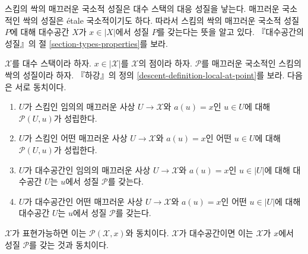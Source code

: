 \noindent
스킴의 싹의 매끄러운 국소적 성질은 대수 스택의 대응 성질을 낳는다.
매끄러운 국소적인 싹의 성질은 \'etale 국소적이기도 하다.
따라서 스킴의 싹의 매끄러운 국소적 성질 $P$에 대해 대수공간 $X$가
$x \in |X|$에서 성질 $P$를 갖는다는 뜻을 알고 있다.
『대수공간의 성질』의 절 \ref{section-types-properties}를 보라.

\begin{lemma}
\label{lemma-local-source-target-at-point}
$\mathcal{X}$를 대수 스택이라 하자.
$x \in |\mathcal{X}|$를 $\mathcal{X}$의 점이라 하자.
$\mathcal{P}$를 매끄러운 국소적인 스킴의 싹의 성질이라 하자.
『하강』의 정의 \ref{descent-definition-local-at-point}를 보라.
다음은 서로 동치이다.
\begin{enumerate}
\item $U$가 스킴인 임의의 매끄러운 사상 $U \to \mathcal{X}$와
$a(u) = x$인 $u \in U$에 대해 $\mathcal{P}(U, u)$가 성립한다.
\item $U$가 스킴인 어떤 매끄러운 사상 $U \to \mathcal{X}$와
$a(u) = x$인 어떤 $u \in U$에 대해 $\mathcal{P}(U, u)$가 성립한다.
\item $U$가 대수공간인 임의의 매끄러운 사상
$U \to \mathcal{X}$와 $a(u) = x$인 $u \in |U|$에 대해
대수공간 $U$는 $u$에서 성질 $\mathcal{P}$를 갖는다.
\item $U$가 대수공간인 어떤 매끄러운 사상
$U \to \mathcal{X}$와 $a(u) = x$인 어떤 $u \in |U|$에 대해
대수공간 $U$는 $u$에서 성질 $\mathcal{P}$를 갖는다.
\end{enumerate}
$\mathcal{X}$가 표현가능하면 이는 $\mathcal{P}(\mathcal{X}, x)$와
동치이다. $\mathcal{X}$가 대수공간이면 이는 $\mathcal{X}$가
$x$에서 성질 $\mathcal{P}$를 갖는 것과 동치이다.
\end{lemma}

